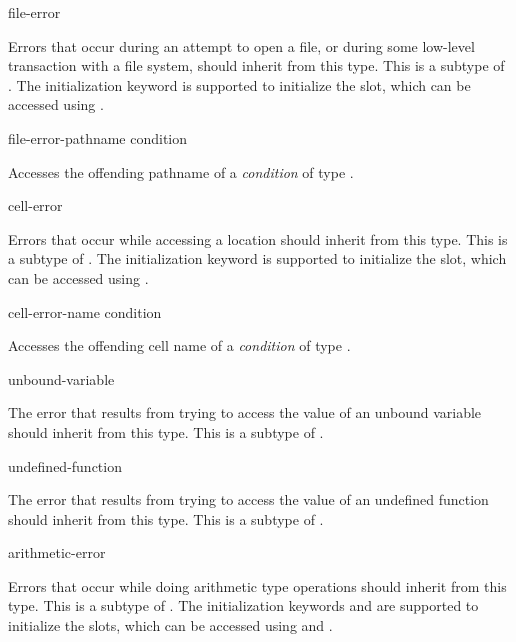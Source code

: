\begin{defun}[Type]
file-error

Errors that occur during an attempt to open a file, or during some low-level
transaction with a file system, should inherit from this type. This is a subtype
of . The initialization keyword  is supported to
initialize the slot, which can be accessed using .
\end{defun}

\begin{defun}[Function]
file-error-pathname condition

Accesses the offending pathname of a \emph{condition} of type .
\end{defun}

\begin{defun}[Type]
cell-error

Errors that occur while accessing a location should inherit from this type. This
is a subtype of .  The initialization keyword  is supported
to initialize the slot, which can be accessed using .
\end{defun}

\begin{defun}[Function]
cell-error-name condition

Accesses the offending cell name of a \emph{condition} of type .
\end{defun}

\begin{defun}[Type]
unbound-variable

The error that results from trying to access the value of an unbound variable
should inherit from this type. This is a subtype of .
\end{defun}

\begin{defun}[Type]
undefined-function

The error that results from trying to access the value of an undefined function
should inherit from this type. This is a subtype of .
\end{defun}

\begin{defun}[Type]
arithmetic-error

Errors that occur while doing arithmetic type operations should inherit from
this type. This is a subtype of . The initialization keywords
 and  are supported to initialize the slots, which
can be accessed using  and
.
\end{defun}

